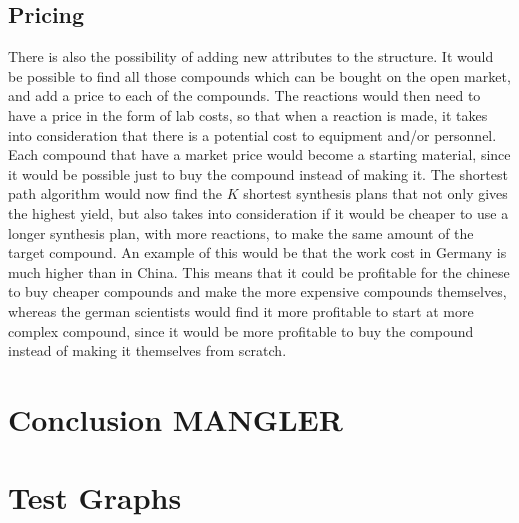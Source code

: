 \documentclass[a4paper,10pt,titlepage]{paper}
\begin{document}
\subsection{Pricing}
There is also the possibility of adding new attributes to the structure. It would be possible to find all those compounds which can be bought on the open market, and add a price to each of the compounds. The reactions would then need to have a price in the form of lab costs, so that when a reaction is made, it takes into consideration that there is a potential cost to equipment and/or personnel.\\
Each compound that have a market price would become a starting material, since it would be possible just to buy the compound instead of making it. The shortest path algorithm would now find the $K$ shortest synthesis plans that not only gives the highest yield, but also takes into consideration if it would be cheaper to use a longer synthesis plan, with more reactions, to make the same amount of the target compound. An example of this would be that the work cost in Germany is much higher than in China. This means that it could be profitable for the chinese to buy cheaper compounds and make the more expensive compounds themselves, whereas the german scientists would find it more profitable to start at more complex compound, since it would be more profitable to buy the compound instead of making it themselves from scratch.
\section{Conclusion MANGLER}
\label{sec::Conclusion}
\newpage

\printbibliography[type=book, title={Books}]
\printbibliography[type=article, title={Articles}]
\printbibliography[nottype=book, nottype=article, title={Other}]

\newpage
\appendix
{}
\section{Test Graphs}
\end{document}
